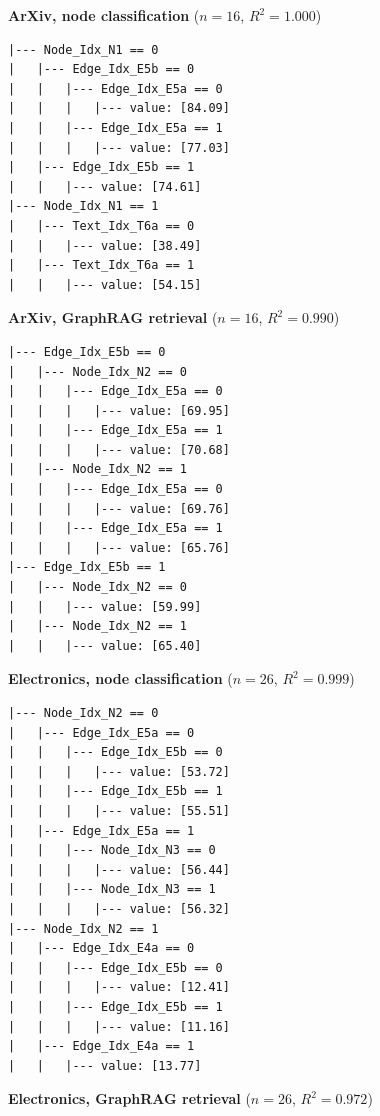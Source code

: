 \begin{figure}[t]
\centering
\scriptsize
\begin{minipage}[t]{0.48\textwidth}
\centering\textbf{ArXiv, node classification} ($n{=}16$, $R^2{=}1.000$)
\begin{verbatim}
|--- Node_Idx_N1 == 0
|   |--- Edge_Idx_E5b == 0
|   |   |--- Edge_Idx_E5a == 0
|   |   |   |--- value: [84.09]
|   |   |--- Edge_Idx_E5a == 1
|   |   |   |--- value: [77.03]
|   |--- Edge_Idx_E5b == 1
|   |   |--- value: [74.61]
|--- Node_Idx_N1 == 1
|   |--- Text_Idx_T6a == 0
|   |   |--- value: [38.49]
|   |--- Text_Idx_T6a == 1
|   |   |--- value: [54.15]
\end{verbatim}
\end{minipage}
\hfill
\begin{minipage}[t]{0.48\textwidth}
\centering\textbf{ArXiv, GraphRAG retrieval} ($n{=}16$, $R^2{=}0.990$)
\begin{verbatim}
|--- Edge_Idx_E5b == 0
|   |--- Node_Idx_N2 == 0
|   |   |--- Edge_Idx_E5a == 0
|   |   |   |--- value: [69.95]
|   |   |--- Edge_Idx_E5a == 1
|   |   |   |--- value: [70.68]
|   |--- Node_Idx_N2 == 1
|   |   |--- Edge_Idx_E5a == 0
|   |   |   |--- value: [69.76]
|   |   |--- Edge_Idx_E5a == 1
|   |   |   |--- value: [65.76]
|--- Edge_Idx_E5b == 1
|   |--- Node_Idx_N2 == 0
|   |   |--- value: [59.99]
|   |--- Node_Idx_N2 == 1
|   |   |--- value: [65.40]
\end{verbatim}
\end{minipage}
\vspace{0.4em}
\begin{minipage}[t]{0.48\textwidth}
\centering\textbf{Electronics, node classification} ($n{=}26$, $R^2{=}0.999$)
\begin{verbatim}
|--- Node_Idx_N2 == 0
|   |--- Edge_Idx_E5a == 0
|   |   |--- Edge_Idx_E5b == 0
|   |   |   |--- value: [53.72]
|   |   |--- Edge_Idx_E5b == 1
|   |   |   |--- value: [55.51]
|   |--- Edge_Idx_E5a == 1
|   |   |--- Node_Idx_N3 == 0
|   |   |   |--- value: [56.44]
|   |   |--- Node_Idx_N3 == 1
|   |   |   |--- value: [56.32]
|--- Node_Idx_N2 == 1
|   |--- Edge_Idx_E4a == 0
|   |   |--- Edge_Idx_E5b == 0
|   |   |   |--- value: [12.41]
|   |   |--- Edge_Idx_E5b == 1
|   |   |   |--- value: [11.16]
|   |--- Edge_Idx_E4a == 1
|   |   |--- value: [13.77]
\end{verbatim}
\end{minipage}
\hfill
\begin{minipage}[t]{0.48\textwidth}
\centering\textbf{Electronics, GraphRAG retrieval} ($n{=}26$, $R^2{=}0.972$)

\end{minipage}
\end{figure}
